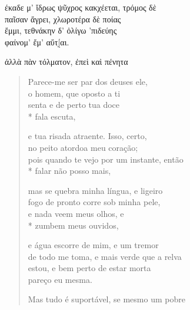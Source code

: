{\begin{gkverse}
\dagger{}έκαδε\dagger{} μ’ ἴδρως ψῦχρος κακχέεται, τρόμος δὲ\\
παῖσαν ἄγρει, χλωροτέρα δὲ ποίας\\
ἔμμι, τεθνάκην δ’ ὀλίγω ’πιδεύης\\
φαίνομ’ ἔμ’ αὔτ[̣αι.

ἀλλὰ πὰν τόλματον, ἐπεὶ \dagger{}καὶ πένητα\dagger{}
\end{gkverse}

\pagebreak
\begin{verse}
Parece-me ser par dos deuses ele,\\
o homem, que oposto a ti\\
senta e de perto tua doce\\*
fala escuta,

e tua risada atraente. Isso, certo,\\
no peito atordoa meu coração;\\
pois quando te vejo por um instante, então\\*
falar não posso mais,

mas se quebra minha língua, e ligeiro\\
fogo de pronto corre sob minha pele,\\
e nada veem meus olhos, e\\*
zumbem meus ouvidos,

e água escorre de mim, e um tremor\\
de todo me toma, e mais verde que a relva\\
estou, e bem perto de estar morta\\
pareço eu mesma.

Mas tudo é suportável, se mesmo um pobre 
\end{verse}

}
